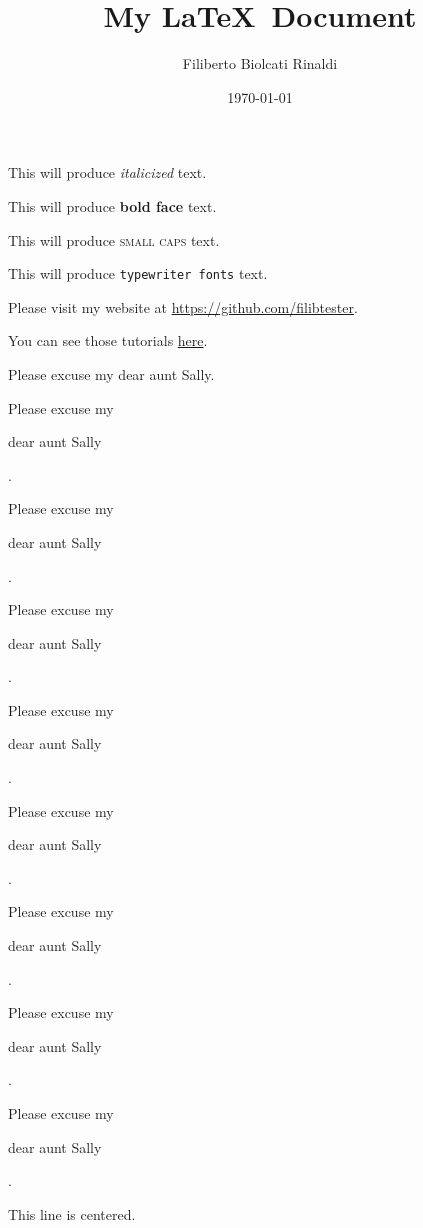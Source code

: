 \documentclass[11pt]{article}
\title{My \LaTeX\ Document}
\author{Filiberto Biolcati Rinaldi}
\date{\today}
\begin{document}
\tableofcontents
\maketitle         %

This will produce \textit{italicized}  text.

This will produce \textbf{bold face}  text.

This will produce \textsc{small caps} text.

This will produce \texttt{typewriter fonts} text.

Please visit my website at 
\url{https://github.com/filibtester}.

You can see those tutorials \href{https://github.com/filibtester/latex}{here}.

\vspace{1cm}
Please excuse my dear aunt Sally.

Please excuse my \begin{large}dear aunt Sally\end{large}.

Please excuse my \begin{Large}dear aunt Sally\end{Large}.

Please excuse my \begin{huge} dear aunt Sally\end{huge}.

Please excuse my \begin{Huge} dear aunt Sally\end{Huge}.

\vspace{1cm} 

Please excuse my \begin{normalsize} dear aunt Sally\end{normalsize}. 

Please excuse my \begin{small} dear aunt Sally\end{small}.

Please excuse my \begin{scriptsize} dear aunt Sally\end{scriptsize}. 

Please excuse my \begin{tiny} dear aunt Sally\end{tiny}. 

\begin{center}
This line is centered.
\end{center}
\end{document}
